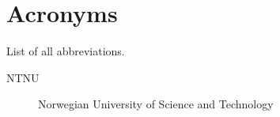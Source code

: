 \chapter{Acronyms}
\label{chp:acronyms}
\begin{info}
	List of all abbreviations.
\end{info}
\begin{description}

	\item[NTNU] Norwegian University of Science and Technology

\end{description}
